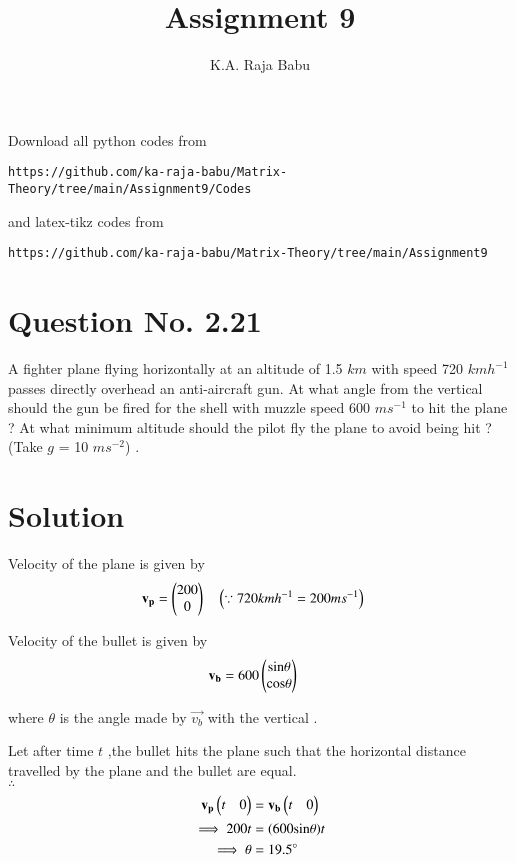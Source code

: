 \documentclass[journal,12pt,twocolumn]{IEEEtran}
\begin{document}
     \def\rightbox#1{\makebox[0in][r]{#1}}
     \def\centbox#1{\makebox[0in]{#1}}
     \def\topbox#1{\raisebox{-\baselineskip}[0in][0in]{#1}}
     \def\midbox#1{\raisebox{-0.5\baselineskip}[0in][0in]{#1}}
\vspace{3cm}
\title{Assignment 9}
\author{K.A. Raja Babu}
\maketitle
\newpage
\bigskip
\renewcommand{\thefigure}{\theenumi}
\renewcommand{\thetable}{\theenumi}
Download all python codes from 
\begin{lstlisting}
https://github.com/ka-raja-babu/Matrix-Theory/tree/main/Assignment9/Codes
\end{lstlisting}
%
and latex-tikz codes from 
%
\begin{lstlisting}
https://github.com/ka-raja-babu/Matrix-Theory/tree/main/Assignment9
\end{lstlisting}
%
\section{Question No. 2.21}
A fighter plane flying horizontally at an altitude of 1.5 $km$ with speed 720 $kmh^{-1}$ passes directly overhead an anti-aircraft gun. At what angle from the vertical should the gun be fired for the shell with muzzle speed 600 $ms^{-1}$ to hit the plane ? At what minimum altitude should the pilot fly the plane to avoid being hit ? (Take $g$ = 10 $ms^{-2}$) .
%
\section{Solution}
%

Velocity of the plane is given by
\begin{align}
    \mathbf{v_p} &= \begin{pmatrix}200 \\ 0\end{pmatrix} \quad \left(\because 720 kmh^{-1}=200 ms^{-1}\right)
\end{align}

Velocity of the bullet is given by
\begin{align}
    \mathbf{v_b} &= 600\begin{pmatrix}\text{sin} \theta \\ \text{cos} \theta\end{pmatrix}
\end{align}

where $\theta$ is the angle made by $\vec{v_b}$ with the vertical .

Let after time $t$ ,the bullet hits the plane such that the horizontal distance travelled by the plane and the bullet are equal.
\\
$\therefore$
\begin{align}
    \mathbf{v_p}\begin{pmatrix}t & 0\end{pmatrix} &= \mathbf{v_b}\begin{pmatrix}t & 0\end{pmatrix}
    \\
    \implies 200t &= (600\text{sin}\theta) t
    \\
    \implies \theta &= 19.5\degree
\end{align}
\end{document}

